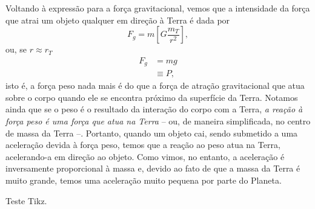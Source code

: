 Voltando à expressão para a força gravitacional, vemos que a intensidade da força que atrai um objeto qualquer em direção à Terra é dada por
\begin{equation}
  F_g = m \left[G \frac{m_T}{r^2}\right],
\end{equation}
%
ou, se $r \approx r_T$
\begin{align}
  F_g &= mg \\
  &\equiv P,
\end{align}
%
isto é, a força peso nada mais é do que a força de atração gravitacional que atua sobre o corpo quando ele se encontra próximo da superfície da Terra. Notamos ainda que se o peso é o resultado da interação do corpo com a Terra, \emph{a reação à força peso é uma força que atua na Terra} -- ou, de maneira simplificada, no centro de massa da Terra --. Portanto, quando um objeto cai, sendo submetido a uma aceleração devida à força peso, temos que a reação ao peso atua na Terra, acelerando-a em direção ao objeto. Como vimos, no entanto, a aceleração é inversamente proporcional à massa e, devido ao fato de que a massa da Terra é muito grande, temos uma aceleração muito pequena por parte do Planeta.
\begin{marginfigure}[-5cm]
\caption{Teste Tikz.}
\end{marginfigure}
